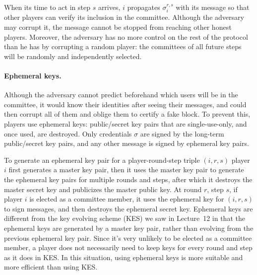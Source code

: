 \documentclass{article}
\newcommand{\bba}{\ensuremath{BBA^*}\xspace}
\begin{document}
When its time to act in step $s$ arrives, $i$ propagates $\sigma_i^{r,s}$ with its message so that other players can verify its inclusion in the committee. Although the adversary may corrupt it, the message cannot be stopped from reaching other honest players. Moreover, the adversary has no more control on the rest of the protocol than he has by corrupting a random player: the committees of all future steps will be randomly and independently selected.


\paragraph{Ephemeral keys.} Although the adversary cannot predict beforehand which users will be in the committee, it would know their identities after seeing their messages, and could then corrupt all of them and oblige them to certify a fake block. To prevent this, players use ephemeral keys: public/secret key pairs that are single-use-only, and once used, are destroyed. Only credentials $\sigma$ are signed by the long-term public/secret key pairs, and any other message is signed by ephemeral key pairs. 

To generate an ephemeral key pair for a player-round-step triple $(i,r,s)$ %
player $i$ first generates a master key pair, then it uses the master key pair to generate the ephemeral key pairs for multiple rounds and steps, after which it destroys the master secret key and publicizes the master public key. At round $r$, step $s$, if player $i$ is elected as a committee member, it uses the ephemeral key for $(i,r,s)$ to sign messages, and then destroys the ephemeral secret key. Ephemeral keys are different from the key evolving scheme (KES) we saw in Lecture~12 in that the ephemeral keys are generated by a master key pair, rather than evolving from the previous ephemeral key pair. Since it's very unlikely to be elected as a committee member, a player does not necessarily need to keep keys for every round and step as it does in KES. In this situation, using ephemeral keys is more suitable and more efficient than using KES. 
\end{document}
